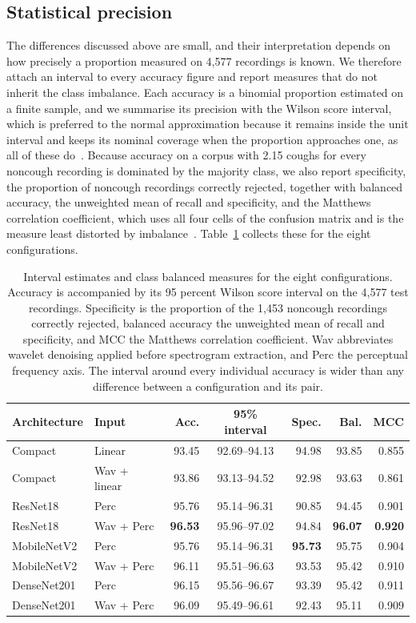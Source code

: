 \documentclass[pdflatex,sn-mathphys-num]{sn-jnl}
\begin{document}
\subsection{Statistical precision}\label{sec:res-precision}

The differences discussed above are small, and their interpretation depends on
how precisely a proportion measured on 4,577 recordings is known. We therefore
attach an interval to every accuracy figure and report measures that do not
inherit the class imbalance. Each accuracy is a binomial proportion estimated
on a finite sample, and we summarise its precision with the Wilson score
interval, which is preferred to the normal approximation because it remains
inside the unit interval and keeps its nominal coverage when the proportion
approaches one, as all of these do~\cite{brown2001}. Because accuracy on a
corpus with 2.15 coughs for every noncough recording is dominated by the
majority class, we also report specificity, the proportion of noncough
recordings correctly rejected, together with balanced accuracy, the unweighted
mean of recall and specificity, and the Matthews correlation coefficient,
which uses all four cells of the confusion matrix and is the measure least
distorted by imbalance~\cite{chicco2020}. Table~\ref{tab:interval} collects
these for the eight configurations.

\begin{table}[t]
\centering
\footnotesize
\caption{Interval estimates and class balanced measures for the eight
configurations. Accuracy is accompanied by its 95 percent Wilson score
interval on the 4,577 test recordings. Specificity is the proportion of the
1,453 noncough recordings correctly rejected, balanced accuracy the unweighted
mean of recall and specificity, and MCC the Matthews correlation coefficient.
Wav abbreviates wavelet denoising applied before spectrogram extraction, and
Perc the perceptual frequency axis. The interval around every individual
accuracy is wider than any difference between a configuration and its pair.}
\label{tab:interval}
\begin{tabular}{@{}llrcrrr@{}}
\toprule
Architecture & Input & Acc. & 95\% interval & Spec. & Bal. & MCC \\
\midrule
Compact & Linear & 93.45 & 92.69--94.13 & 94.98 & 93.85 & 0.855 \\
Compact & Wav + linear & 93.86 & 93.13--94.52 & 92.98 & 93.63 & 0.861 \\
ResNet18 & Perc & 95.76 & 95.14--96.31 & 90.85 & 94.45 & 0.901 \\
ResNet18 & Wav + Perc & \textbf{96.53} & 95.96--97.02 & 94.84 & \textbf{96.07} & \textbf{0.920} \\
MobileNetV2 & Perc & 95.76 & 95.14--96.31 & \textbf{95.73} & 95.75 & 0.904 \\
MobileNetV2 & Wav + Perc & 96.11 & 95.51--96.63 & 93.53 & 95.42 & 0.910 \\
DenseNet201 & Perc & 96.15 & 95.56--96.67 & 93.39 & 95.42 & 0.911 \\
DenseNet201 & Wav + Perc & 96.09 & 95.49--96.61 & 92.43 & 95.11 & 0.909 \\
\bottomrule
\end{tabular}
\end{table}
\end{document}
